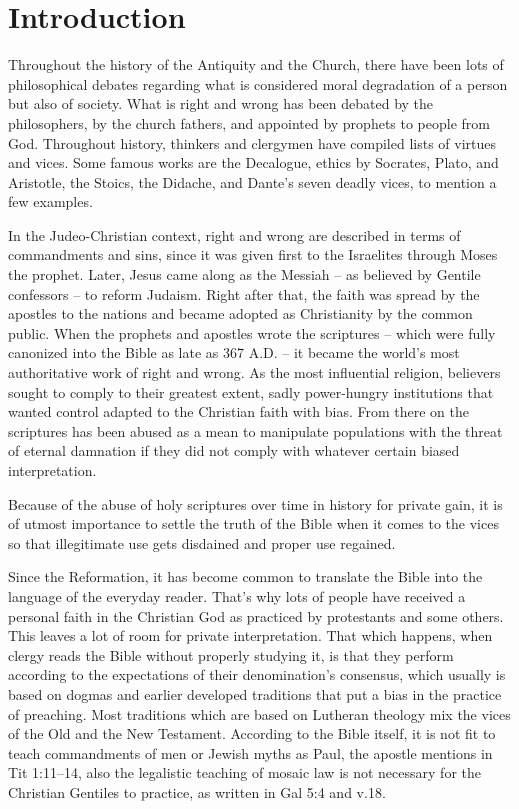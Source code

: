 \section{Introduction}

Throughout the history of the Antiquity and the Church, there have been lots of
philosophical debates regarding what is considered moral degradation of a person 
but also of society. What is right and wrong has been debated by the philosophers, 
by the church fathers, and appointed by prophets to people from God. Throughout 
history, thinkers and clergymen have compiled lists of virtues and vices. Some 
famous works are the Decalogue, ethics by Socrates, Plato, and Aristotle, the 
Stoics, the Didache, and Dante's seven deadly vices, to mention a few examples.

In the Judeo-Christian context, right and wrong are described in terms of 
commandments and sins, since it was given first to the Israelites through Moses 
the prophet. Later, Jesus came along as the Messiah -- as believed by Gentile 
confessors -- to reform Judaism. Right after that, the faith was spread by the 
apostles to the nations and became adopted as Christianity by the common public. 
When the prophets and apostles wrote the scriptures -- which were fully canonized 
into the Bible as late as 367 A.D. -- it became the world's most authoritative 
work of right and wrong. As the most influential religion, believers sought to
comply to their greatest extent, sadly power-hungry institutions that wanted control
adapted to the Christian faith with bias. From there on the scriptures has been
abused as a mean to manipulate populations with the threat of eternal damnation
if they did not comply with whatever certain biased interpretation.

Because of the abuse of holy scriptures over time in history for private gain,
it is of utmost importance to settle the truth of the Bible when it comes to the 
vices so that illegitimate use gets disdained and proper use regained. 

Since the Reformation, it has become common to translate the Bible into the 
language of the everyday reader. That's why lots of people have received a 
personal faith in the Christian God as practiced by protestants and some others. 
This leaves a lot of room for private interpretation. That which happens, when 
clergy reads the Bible without properly studying it, is that they perform 
according to the expectations of their denomination's consensus, which usually 
is based on dogmas and earlier developed traditions that put a bias in the practice 
of preaching. Most traditions which are based on Lutheran theology mix the vices 
of the Old and the New Testament. According to the Bible itself, it is not fit 
to teach commandments of men or Jewish myths as Paul, the apostle mentions in 
Tit 1:11--14, also the legalistic teaching of mosaic law is not necessary for 
the Christian Gentiles to practice, as written in Gal 5:4 and v.18.

